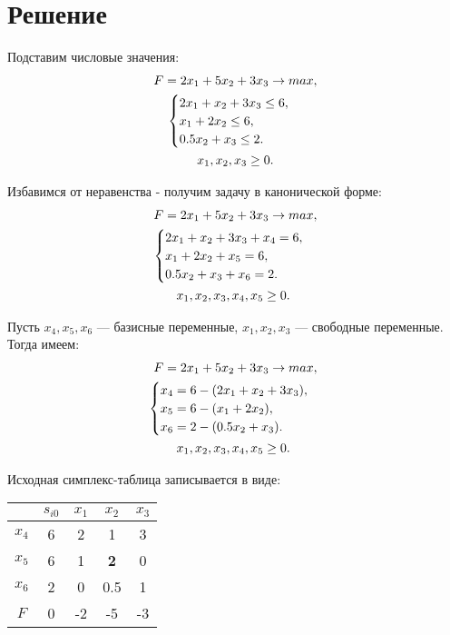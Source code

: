 \documentclass[12pt,a4paper,oneside]{extarticle}
\begin{document}
\section{Решение}

    Подставим числовые значения:
    \begin{gather}
        F = 2x_1+5x_2+3x_3 \rightarrow max,  \notag  \\
        \begin{cases}
            2x_1 + x_2 + 3x_3 \leq 6, \\
            x_1 + 2x_2 \leq 6, \\
            0.5x_2 + x_3 \leq 2.
        \end{cases} \notag \\
        x_1, x_2, x_3 \geq 0. \notag
    \end{gather} 

    Избавимся от неравенства - получим задачу в канонической форме:
    \begin{gather}
        F = 2x_1+5x_2+3x_3 \rightarrow max,  \notag  \\
        \begin{cases}
            2x_1 + x_2 + 3x_3 + x_4 = 6, \\
            x_1 + 2x_2 + x_5 = 6, \\
            0.5x_2 + x_3 + x_6 = 2.
        \end{cases} 
        \notag \\ x_1, x_2, x_3, x_4, x_5 \geq 0. \
    \end{gather} 

    Пусть $x_4,x_5,x_6$ --- базисные переменные, $x_1,x_2,x_3$ --- свободные переменные. Тогда имеем:
    \begin{gather}
        F = 2x_1+5x_2+3x_3 \rightarrow max,  \notag  \\
        \begin{cases}
            x_4 = 6 - (2x_1 + x_2 + 3x_3), \\
            x_5 = 6 - (x_1 + 2x_2),\\
            x_6 = 2 - (0.5x_2 + x_3).
        \end{cases} 
        \notag \\ x_1, x_2, x_3, x_4, x_5 \geq 0. \
    \end{gather} 

    Исходная симплекс-таблица записывается в виде:
    \begin{center}
        \begin{tabular}{|c|c|c|c|c|}
            \hline
                 & $s_{i0}$ & $x_1$ & $x_2$ & $x_3$ \\ \hline
            $x_4$ & 6       & 2     & 1     & 3 \\ \hline
            $x_5$ & 6       & 1     &{\bf 2}& 0 \\ \hline
            $x_6$ & 2       & 0     & 0.5   & 1 \\ \hline
            $F$   & 0       & -2    & -5    & -3 \\ \hline
        \end{tabular}
    \end{center}
\end{document}
